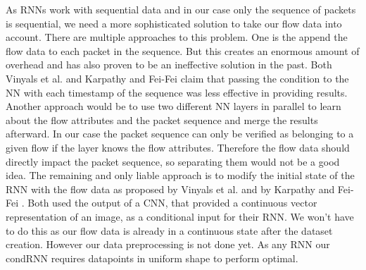 \documentclass[
	ngerman,
	ruledheaders=section,%
	class=report,%
	thesis={type=bachelor},%
	accentcolor=9c,%
	custommargins=true,%
	marginpar=false,%
	parskip=half-,%
	fontsize=11pt,%
	twoside
]{tudapub}
\begin{document}
As RNNs work with sequential data and in our case only the sequence of packets is sequential, we need a more sophisticated solution to take our flow data into account.
There are multiple approaches to this problem.
One is the append the flow data to each packet in the sequence.
But this creates an enormous amount of overhead and has also proven to be an ineffective solution in the past.
Both Vinyals et al. \cite{vinyalsShowTellNeural2015} and Karpathy and Fei-Fei \cite{karpathyDeepVisualSemanticAlignments2015} claim that passing the condition to the NN with each timestamp of the sequence was less effective in providing results.
Another approach would be to use two different NN layers in parallel to learn about the flow attributes and the packet sequence and merge the results afterward.
In our case the packet sequence can only be verified as belonging to a given flow if the layer knows the flow attributes.
Therefore the flow data should directly impact the packet sequence, so separating them would not be a good idea.
The remaining and only liable approach is to modify the initial state of the RNN with the flow data as proposed by Vinyals et al. \cite{vinyalsShowTellNeural2015} and by Karpathy and Fei-Fei \cite{karpathyDeepVisualSemanticAlignments2015}.
Both used the output of a CNN, that provided a continuous vector representation of an image, as a conditional input for their RNN.
We won't have to do this as our flow data is already in a continuous state after the dataset creation.
However our data preprocessing is not done yet.
As any RNN our condRNN requires datapoints in uniform shape to perform optimal.
\end{document}
